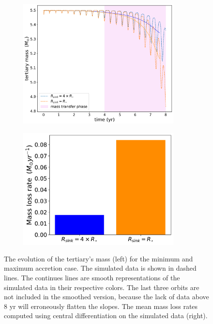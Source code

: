 \begin{figure}[H]
    \centering
    \begin{subfigure}{.5\textwidth}
    \centering
    \includegraphics[width=0.9\textwidth]{Thesis/graphs/accretion_case/accretion_mass_loss.pdf}
    \end{subfigure}%
    \begin{subfigure}{.5\textwidth}
    \centering
    \includegraphics[width=0.9\textwidth]{Thesis/graphs/accretion_case/accretion_giant_mass_loss_rate.pdf}
    \end{subfigure}
    \caption{ The evolution of the tertiary's mass (left) for the minimum and maximum accretion case. The simulated data is shown in dashed lines. The continues lines are smooth representations of the simulated data in their respective colors. The last three orbits are not included in the smoothed version, because the lack of data above $8$ yr will erroneously flatten the slopes. The mean mass loss rates computed using central differentiation on the simulated data (right).}
    \label{fig:accretion_tertiary_mass}
\end{figure}


